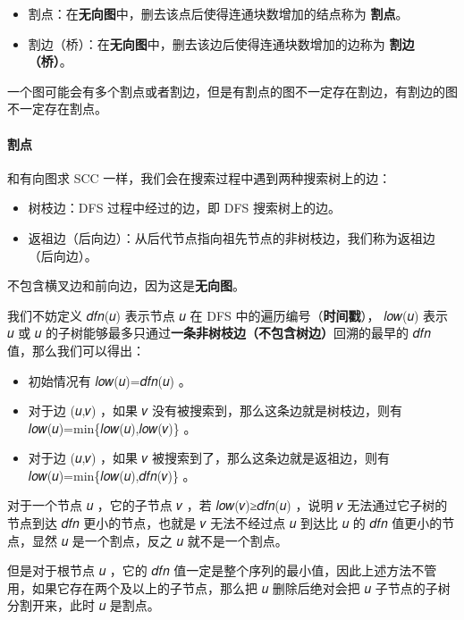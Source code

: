 \documentclass[]{article}
\providecommand{\tightlist}{%
  \setlength{\itemsep}{0pt}\setlength{\parskip}{0pt}}
\let\oldparagraph\paragraph
\renewcommand{\paragraph}[1]{\oldparagraph{#1}\mbox{}}
\begin{document}
\begin{itemize}
\tightlist
\item
  割点：在\textbf{无向图}中，删去该点后使得连通块数增加的结点称为
  \textbf{割点}。
\item
  割边（桥）：在\textbf{无向图}中，删去该边后使得连通块数增加的边称为
  \textbf{割边（桥）}。
\end{itemize}

一个图可能会有多个割点或者割边，但是有割点的图不一定存在割边，有割边的图不一定存在割点。

\hypertarget{ux5272ux70b9}{%
\paragraph{割点}\label{ux5272ux70b9}}

和有向图求 SCC 一样，我们会在搜索过程中遇到两种搜索树上的边：

\begin{itemize}
\tightlist
\item
  树枝边：DFS 过程中经过的边，即 DFS 搜索树上的边。
\item
  返祖边（后向边）：从后代节点指向祖先节点的非树枝边，我们称为返祖边（后向边）。
\end{itemize}

不包含横叉边和前向边，因为这是\textbf{无向图}。

我们不妨定义 𝑑𝑓𝑛(𝑢) 表示节点 𝑢 在 DFS 中的遍历编号（\textbf{时间戳}），
𝑙𝑜𝑤(𝑢) 表示 𝑢 或 𝑢
的子树能够最多只通过\textbf{一条非树枝边（不包含树边）}回溯的最早的 𝑑𝑓𝑛
值，那么我们可以得出：

\begin{itemize}
\tightlist
\item
  初始情况有 𝑙𝑜𝑤(𝑢)=𝑑𝑓𝑛(𝑢) 。
\item
  对于边 (𝑢,𝑣) ，如果 𝑣 没有被搜索到，那么这条边就是树枝边，则有
  𝑙𝑜𝑤(𝑢)=min\{𝑙𝑜𝑤(𝑢),𝑙𝑜𝑤(𝑣)\} 。
\item
  对于边 (𝑢,𝑣) ，如果 𝑣 被搜索到了，那么这条边就是返祖边，则有
  𝑙𝑜𝑤(𝑢)=min\{𝑙𝑜𝑤(𝑢),𝑑𝑓𝑛(𝑣)\} 。
\end{itemize}

对于一个节点 𝑢 ，它的子节点 𝑣 ，若 𝑙𝑜𝑤(𝑣)≥𝑑𝑓𝑛(𝑢) ，说明 𝑣
无法通过它子树的节点到达 𝑑𝑓𝑛 更小的节点，也就是 𝑣 无法不经过点 𝑢 到达比
𝑢 的 𝑑𝑓𝑛 值更小的节点，显然 𝑢 是一个割点，反之 𝑢 就不是一个割点。

但是对于根节点 𝑢 ，它的 𝑑𝑓𝑛
值一定是整个序列的最小值，因此上述方法不管用，如果它存在两个及以上的子节点，那么把
𝑢 删除后绝对会把 𝑢 子节点的子树分割开来，此时 𝑢 是割点。
\end{document}
